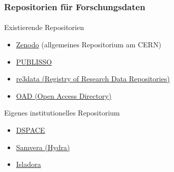 \begin{frame}[fragile]
    \frametitle{Repositorien für Forschungsdaten}
    \framesubtitle{}

    \begin{block}{Existierende Repositorien}

        \begin{itemize}
            \item[\ExternalLink] \href{https://zenodo.org/}{Zenodo} (allgemeines Repositorium am CERN)
                \newline
            \item[\ExternalLink] \href{http://www.publisso.de/open-access-publizieren/forschungsdaten/forschungsdatenrepositorien/}{PUBLISSO} 
            \item[\ExternalLink] \href{http://www.re3data.org/}{re3data (Registry of Research Data Repositories)} 
            \item[\ExternalLink] \href{http://oad.simmons.edu/oadwiki/Data_repositories}{OAD (Open Access Directory)} 
        \end{itemize}
    \end{block}


    \begin{block}{Eigenes institutionelles Repositorium}
        \begin{itemize}
            \item [\ExternalLink] \href{http://www.dspace.org/}{DSPACE}
            \item [\ExternalLink] \href{https://wiki.duraspace.org/display/hydra/The+Hydra+Project#space-menu-link-content}{Samvera (Hydra)}
            \item [\ExternalLink] \href{http://islandora.ca/}{Isladora}
        \end{itemize}
    \end{block}
\end{frame}
